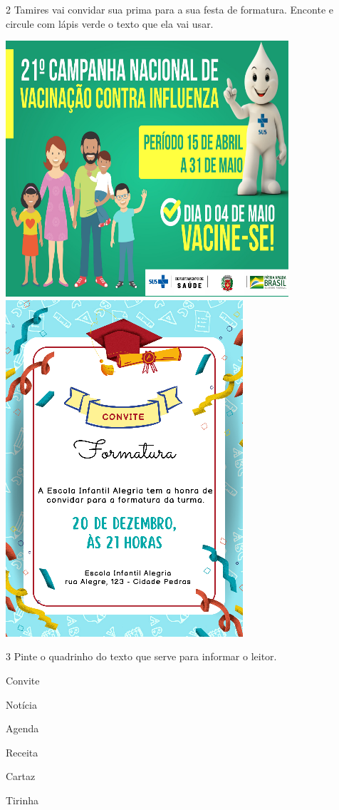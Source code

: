 \pagebreak

\num{2} Tamires vai convidar sua prima para a sua festa de formatura. 
Enconte e circule com lápis verde o texto que ela vai usar. 


\includegraphics[width=.5\textwidth]{media/image100.png}
\includegraphics[width=.5\textwidth]{media/image103.png}


\num{3} Pinte o quadrinho do texto que serve para informar o leitor.


\begin{boxlist}
 Convite

 Notícia

 Agenda 

 Receita

 Cartaz 

 Tirinha
\end{boxlist}

